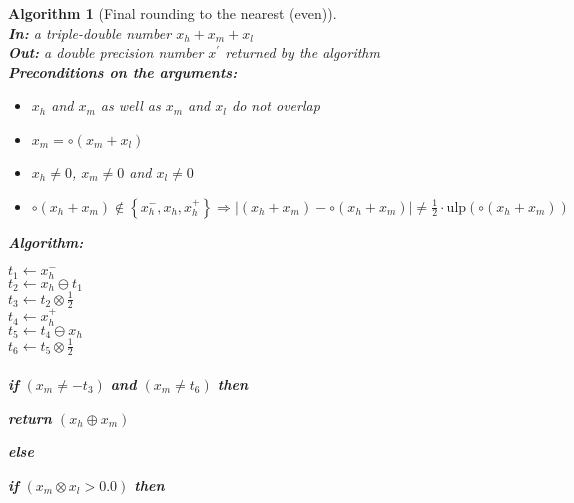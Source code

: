 \documentclass[a4paper,10pt,twoside]{article}
\newtheorem{algorithm}[theorem]{Algorithm}
\newcommand{\hi}{\ensuremath{\mathit{h}}}
\newcommand{\mi}{\ensuremath{\mathit{m}}}
\newcommand{\lo}{\ensuremath{\mathit{l}}}
\newcommand{\mUlp}{\ensuremath{\mathrm{ulp}}}
\begin{document}
\begin{algorithm}[Final rounding to the nearest (even)] \label{algarrpres} ~ \\
{\bf In:} a triple-double number $x_\hi + x_\mi + x_\lo$ \\
{\bf Out:} a double precision number $x^\prime$ returned by the algorithm \\
{\bf Preconditions on the arguments:}
\begin{itemize}
\item $x_\hi$ and $x_\mi$ as well as $x_\mi$ and $x_\lo$ do not overlap
\item $x_\mi = \circ \left( x_\mi + x_\lo \right)$
\item $x_\hi \not = 0$, $x_\mi \not = 0$ and $x_\lo \not = 0$  
\item $\circ \left( x_\hi + x_\mi \right) \not \in \left \lbrace x_\hi^-, x_\hi, x_\hi^+ \right \rbrace \Rightarrow 
\left \vert \left( x_\hi + x_\mi \right) - \circ\left( x_\hi + x_\mi \right) \right \vert \not = 
\frac{1}{2} \cdot \mUlp\left( \circ \left( x_\hi + x_\mi \right) \right)$
\end{itemize}
{\bf Algorithm:} \\
\begin{center}
\begin{minipage}[b]{80mm}
$t_1 \gets x_\hi^-$ \\
$t_2 \gets x_\hi \ominus t_1$ \\
$t_3 \gets t_2 \otimes \frac{1}{2}$ \\
$t_4 \gets x_\hi^+$ \\
$t_5 \gets t_4 \ominus x_\hi$ \\
$t_6 \gets t_5 \otimes \frac{1}{2}$ 
\\ ~ \\
{\bf if} $\left( x_\mi \not = -t_3 \right)$ {\bf and} $\left( x_\mi \not = t_6 \right)$ {\bf then} 
\vspace{-2.4mm}
\begin{center}
\begin{minipage}[b]{70mm}
\vspace{-2.4mm}
{\bf return } $\left( x_\hi \oplus x_\mi \right)$
\end{minipage}
\end{center}
\vspace{-2.4mm}
{\bf else} 
\vspace{-2.4mm}
\begin{center}
\begin{minipage}[b]{70mm}
{\bf if} $\left( x_\mi \otimes x_\lo > 0.0 \right)$ {\bf then} 

\end{minipage}
\end{center}
\end{minipage}
\end{center}
\end{algorithm}
\end{document}
